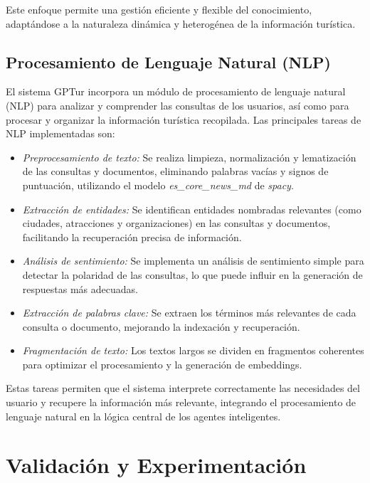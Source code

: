 \documentclass[10pt]{llncs}
\begin{document}
Este enfoque permite una gestión eficiente y flexible del conocimiento, adaptándose a la naturaleza dinámica y heterogénea de la información turística.

\vspace{\baselineskip}
\subsection{Procesamiento de Lenguaje Natural (NLP)}

El sistema GPTur incorpora un módulo de procesamiento de lenguaje natural (NLP) para analizar y comprender las consultas de los usuarios, así como para procesar y organizar la información turística recopilada. Las principales tareas de 
NLP implementadas son:

\begin{itemize}
    \item \textit{Preprocesamiento de texto:} Se realiza limpieza, normalización y lematización de las consultas y documentos, eliminando palabras vacías y signos de puntuación, utilizando el modelo \textit{es\_core\_news\_md} de \textit{spacy}.
    \item \textit{Extracción de entidades:} Se identifican entidades nombradas relevantes (como ciudades, atracciones y organizaciones) en las consultas y documentos, facilitando la recuperación precisa de información.
    \item \textit{Análisis de sentimiento:} Se implementa un análisis de sentimiento simple para detectar la polaridad de las consultas, lo que puede influir en la generación de respuestas más adecuadas.
    \item \textit{Extracción de palabras clave:} Se extraen los términos más relevantes de cada consulta o documento, mejorando la indexación y recuperación.
    \item \textit{Fragmentación de texto:} Los textos largos se dividen en fragmentos coherentes para optimizar el procesamiento y la generación de embeddings.
\end{itemize}

Estas tareas permiten que el sistema interprete correctamente las necesidades del usuario y recupere la información más relevante, integrando el procesamiento de lenguaje natural en la lógica central de los agentes inteligentes.

\vspace{\baselineskip}
\section{Validación y Experimentación}
\end{document}
